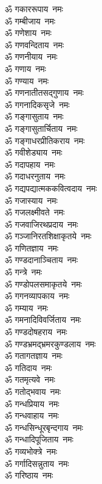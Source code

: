 \begin{flushleft}
\begin{multicols}{2}
ॐ गकाररूपाय~नमः\\
ॐ गम्बीजाय~नमः\\
ॐ गणेशाय~नमः\\
ॐ गणवन्दिताय~नमः\\
ॐ गणनीयाय~नमः\\
ॐ गणाय~नमः\\
ॐ गण्याय~नमः\\
ॐ गणनातीतसद्गुणाय~नमः\\
ॐ गगनादिकसृजे~नमः\\
ॐ गङ्गासुताय~नमः\hfill{}\\
ॐ गङ्गासुतार्चिताय~नमः\\
ॐ गङ्गाधरप्रीतिकराय~नमः\\
ॐ गवीशेड्याय~नमः\\
ॐ गदापहाय~नमः\\
ॐ गदाधरनुताय~नमः\\
ॐ गद्यपद्यात्मककवित्वदाय~नमः\\
ॐ गजास्याय~नमः\\
ॐ गजलक्ष्मीवते~नमः\\
ॐ गजवाजिरथप्रदाय~नमः\\
ॐ गञ्जानिरतशिक्षाकृतये~नमः\hfill{}\\
ॐ गणितज्ञाय~नमः\\
ॐ गण्डदानाञ्चिताय~नमः\\
ॐ गन्त्रे~नमः\\
ॐ गण्डोपलसमाकृतये~नमः\\
ॐ गगनव्यापकाय~नमः\\
ॐ गम्याय~नमः\\
ॐ गमनादिविवर्जिताय~नमः\\
ॐ गण्डदोषहराय~नमः\\
ॐ गण्डभ्रमद्भ्रमरकुण्डलाय~नमः\\
ॐ गतागतज्ञाय~नमः\hfill{}\\
ॐ गतिदाय~नमः\\
ॐ गतमृत्यवे~नमः\\
ॐ गतोद्भवाय~नमः\\
ॐ गन्धप्रियाय~नमः\\
ॐ गन्धवाहाय~नमः\\
ॐ गन्धसिन्धूरबृन्दगाय~नमः\\
ॐ गन्धादिपूजिताय~नमः\\
ॐ गव्यभोक्त्रे~नमः\\
ॐ गर्गादिसन्नुताय~नमः\\
ॐ गरिष्ठाय~नमः\hfill{}\\

\end{multicols}
\end{flushleft}
